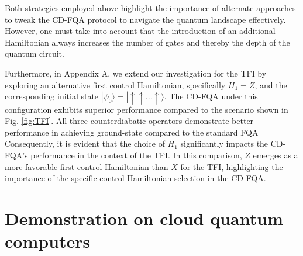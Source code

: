 \documentclass[twocolumn,aps,superscriptaddress,floatfix,longbibliography]{revtex4-2}
\newcommand{\ra}{\rangle}
\begin{document}

Both strategies  employed above highlight the importance of alternate approaches to tweak the CD-FQA protocol to navigate
the quantum landscape effectively. However, one must take into
account that the introduction of an additional Hamiltonian
always increases the number of gates and thereby the depth of
the quantum circuit. 

Furthermore, in Appendix A, we extend our investigation for the TFI by exploring an alternative first control Hamiltonian, specifically $H_1=Z$, and the corresponding initial state $|\psi_0\ra=|\uparrow \uparrow ...\uparrow\ra$. The CD-FQA under this configuration exhibits superior performance compared to the scenario shown in Fig. \ref{fig:TFI}. All three counterdiabatic operators demonstrate better performance in achieving ground-state compared to the standard FQA Consequently, it is evident that the choice of $H_1$ significantly impacts the CD-FQA's performance in the context of the TFI. In this comparison, $Z$ emerges as a more favorable first control Hamiltonian than $X$ for the TFI, highlighting the importance of the specific control Hamiltonian selection in the CD-FQA.

\section{Demonstration on cloud quantum computers}
\label{sec:experiment}

\end{document}
